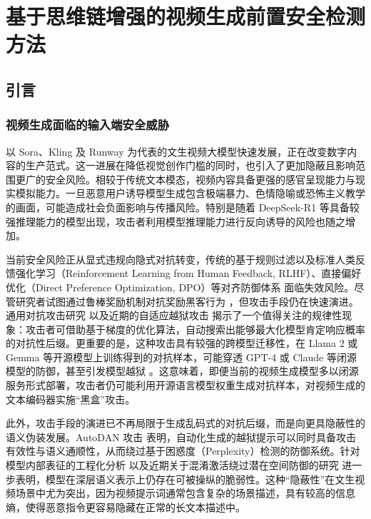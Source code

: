 \chapter{基于思维链增强的视频生成前置安全检测方法}

\section{引言}

\subsection{视频生成面临的输入端安全威胁}

以 Sora、Kling 及 Runway 为代表的文生视频大模型快速发展，正在改变数字内容的生产范式。这一进展在降低视觉创作门槛的同时，也引入了更加隐蔽且影响范围更广的安全风险。相较于传统文本模态，视频内容具备更强的感官呈现能力与现实模拟能力。一旦恶意用户诱导模型生成包含极端暴力、色情隐喻或恐怖主义教学的画面，可能造成社会负面影响与传播风险。特别是随着 DeepSeek-R1 \cite{guo2025deepseek} 等具备较强推理能力的模型出现，攻击者利用模型推理能力进行反向诱导的风险也随之增加。

当前安全风险正从显式违规向隐式对抗转变，传统的基于规则过滤以及标准人类反馈强化学习（Reinforcement Learning from Human Feedback, RLHF）、直接偏好优化（Direct Preference Optimization, DPO）等对齐防御体系 \cite{ouyang2022training, bai2022constitutional, rafailov2023direct, ethayarajh2024kto} 面临失效风险。尽管研究者试图通过鲁棒奖励机制对抗奖励黑客行为 \cite{rashidinejad2024sail}，但攻击手段仍在快速演进。通用对抗攻击研究 \cite{zou2023universal} 以及近期的自适应越狱攻击 \cite{andriushchenko2024jailbreaking} 揭示了一个值得关注的规律性现象：攻击者可借助基于梯度的优化算法，自动搜索出能够最大化模型肯定响应概率的对抗性后缀。更重要的是，这种攻击具有较强的跨模型迁移性，在 Llama 2 \cite{touvron2023llama} 或 Gemma \cite{team2024gemma} 等开源模型上训练得到的对抗样本，可能穿透 GPT-4 或 Claude 等闭源模型的防御，甚至引发模型越狱 \cite{huang2023catastrophic}。这意味着，即便当前的视频生成模型多以闭源服务形式部署，攻击者仍可能利用开源语言模型权重生成对抗样本，对视频生成的文本编码器实施“黑盒”攻击。

此外，攻击手段的演进已不再局限于生成乱码式的对抗后缀，而是向更具隐蔽性的语义伪装发展。AutoDAN 攻击 \cite{liu2023autodan} 表明，自动化生成的越狱提示可以同时具备攻击有效性与语义通顺性，从而绕过基于困惑度（Perplexity）检测的防御系统。针对模型内部表征的工程化分析 \cite{zou2023representation} 以及近期关于混淆激活绕过潜在空间防御的研究 \cite{bailey2024obfuscated} 进一步表明，模型在深层语义表示上仍存在可被操纵的脆弱性。这种“隐蔽性”在文生视频场景中尤为突出，因为视频提示词通常包含复杂的场景描述，具有较高的信息熵，使得恶意指令更容易隐藏在正常的长文本描述中。

